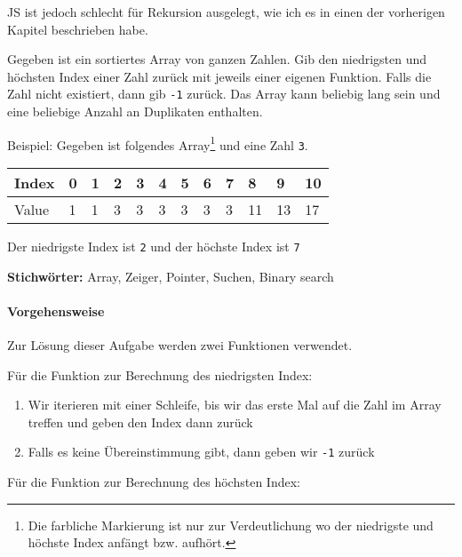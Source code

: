 \documentclass{book}
\begin{document}
JS ist jedoch schlecht für Rekursion ausgelegt, wie ich es in einen der vorherigen Kapitel beschrieben habe.

\begin{examplei}
	Gegeben ist ein sortiertes Array von ganzen Zahlen. Gib den niedrigsten und höchsten Index einer Zahl zurück mit jeweils einer eigenen Funktion. Falls die Zahl nicht existiert, dann gib \lstinline|-1| zurück. Das Array kann beliebig lang sein und eine beliebige Anzahl an Duplikaten enthalten.
	
	Beispiel:
	Gegeben ist folgendes Array\footnote{Die farbliche Markierung ist nur zur Verdeutlichung wo der niedrigste und höchste Index anfängt bzw. aufhört.} und eine Zahl \lstinline|3|. 	
	
	\begin{tabular}{|l|l|l|l|l|l|l|l|l|l|l|l|} 
		\hline
		\cellcolor{gray!25}Index & 0 & 1 & \cellcolor{red!25}2 & \cellcolor{yellow!25}3 & \cellcolor{yellow!25}4 & \cellcolor{yellow!25}5 & \cellcolor{yellow!25}6 & \cellcolor{red!25}7 & 8 & 9 & 10\\
		\hline
		\cellcolor{gray!25}Value & 1 & 1 & \cellcolor{blue!25}3 & \cellcolor{blue!25}3 & \cellcolor{blue!25}3 & \cellcolor{blue!25}3 & \cellcolor{blue!25}3 & \cellcolor{blue!25}3 & 11 & 13 & 17\\
		\hline
	\end{tabular}
	
	Der niedrigste Index ist \lstinline|2| und der höchste Index ist \lstinline|7|
\end{examplei}
{\bf Stichwörter:} Array, Zeiger, Pointer, Suchen, Binary search

\paragraph{Vorgehensweise} Zur Lösung dieser Aufgabe werden zwei Funktionen verwendet.

Für die Funktion zur Berechnung des niedrigsten Index:
\begin{enumerate} 
	\item Wir iterieren mit einer Schleife, bis wir das erste Mal auf die Zahl im Array treffen und geben den Index dann zurück
	\item Falls es keine Übereinstimmung gibt, dann geben wir \lstinline|-1| zurück
\end{enumerate}

Für die Funktion zur Berechnung des höchsten Index:
\end{document}

